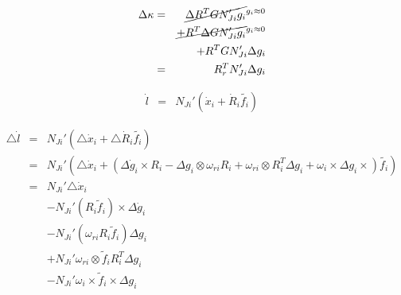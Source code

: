 \begin{eqnarray*}
\Delta\kappa & = & \cancel{\Delta R^{T}GN'_{Ji}g_{i}}^{g_{i}\approx0}\\
 &  & \cancel{+R^{T}\Delta GN'_{Ji}g_{i}}^{g_{i}\approx0}\\
 &  & +R^{T}GN'_{Ji}\Delta g_{i}\\
 & = & R_{r}^{T}N'_{Ji}\Delta g_{i}
\end{eqnarray*}

\begin{eqnarray*}
\dot{l} & = & N_{Ji}'(\dot{x}_{i}+\dot{R}_{i}\tilde{f_{i}})
\end{eqnarray*}

\begin{eqnarray*}
\triangle\dot{l} & = & N_{Ji}'(\triangle\dot{x}_{i}+\triangle\dot{R}_{i}\tilde{f_{i}})\\
 & = & N_{Ji}'(\triangle\dot{x}_{i}+\left(\Delta\dot{g}_{i}\times R_{i}-\Delta g_{i}\otimes\omega_{ri}R_{i}+\omega_{ri}\otimes R_{i}^{T}\Delta g_{i}+\omega_{i}\times\Delta g_{i}\times\right)\tilde{f_{i}})\\
 & = & N_{Ji}'\triangle\dot{x}_{i}\\
 &  & -N_{Ji}'(R_{i}\tilde{f}_{i})\times\Delta\dot{g}_{i}\\
 &  & -N_{Ji}'(\omega_{ri}R_{i}\tilde{f}_{i})\Delta g_{i}\\
 &  & +N_{Ji}'\omega_{ri}\otimes\tilde{f}_{i}R_{i}^{T}\Delta g_{i}\\
 &  & -N_{Ji}'\omega_{i}\times\tilde{f}_{i}\times\Delta g_{i}
\end{eqnarray*}


